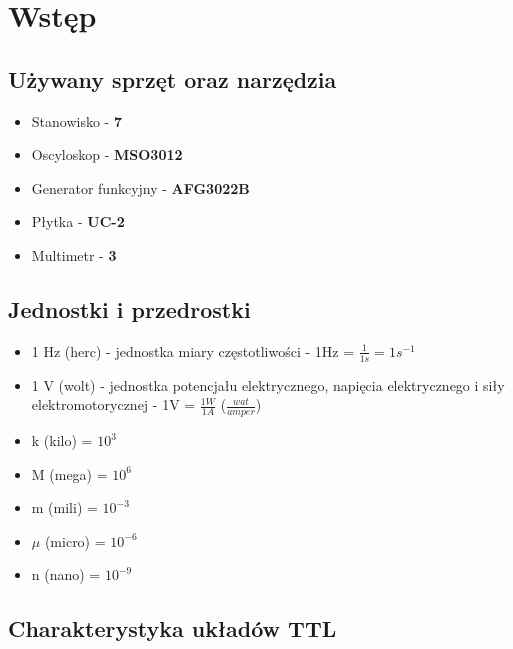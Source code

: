 \chapter{Wstęp}

\section{Używany sprzęt oraz narzędzia}

\begin{itemize}
    \item Stanowisko - \textbf{7}
    \item Oscyloskop - \textbf{MSO3012}
    \item Generator funkcyjny - \textbf{AFG3022B}
    \item Płytka - \textbf{UC-2}
    \item Multimetr - \textbf{3}
\end{itemize}

\section{Jednostki i przedrostki}

\begin{itemize}
    \item 1 Hz (herc) - jednostka miary częstotliwości - 1Hz = $\frac{1}{1s} = 1s^{-1}$
    \item 1 V (wolt) - jednostka potencjału elektrycznego, napięcia elektrycznego i siły elektromotorycznej - 1V = $\frac{1W}{1A}$ ($\frac{wat}{amper}$)
\end{itemize}

\begin{itemize}
    \item k (kilo) = $10^3$
    \item M (mega) = $10^6$
    \item m (mili) = $10^{-3}$
    \item $\mu$ (micro) = $10^{-6}$
    \item n (nano) = $10^{-9}$
\end{itemize}

\section{Charakterystyka układów TTL}
\label{TTL:charakterystyka}

